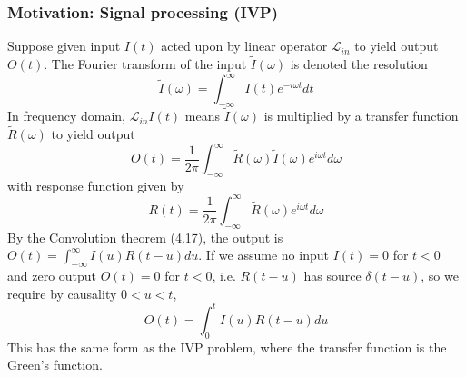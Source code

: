 \documentclass[a4paper]{article}
\begin{document}
\subsubsection*{Motivation: Signal processing (IVP)}
Suppose given input $I(t)$ acted upon by linear operator $\mathcal{L}_{in}$ to yield output $O(t)$. The Fourier transform of the input $\tilde{I}(\omega)$ is denoted the resolution
\begin{equation}
    \tilde{I}(\omega)=\int_{-\infty}^\infty I(t)e^{-i\omega t}dt\tag{4.24}
\end{equation}
In frequency domain, $\mathcal{L}_{in}I(t)$ means $\tilde{I}(\omega)$ is multiplied by a transfer function $\tilde{R}(\omega)$ to yield output
\begin{equation}
    O(t)=\frac{1}{2\pi}\int_{-\infty}^\infty\tilde{R}(\omega)\tilde{I}(\omega)e^{i\omega t}d\omega\tag{4.25}
\end{equation}
with response function given by
\begin{equation}
    R(t)=\frac{1}{2\pi}\int_{-\infty}^\infty\tilde{R}(\omega)e^{i\omega t}d\omega\tag{4.26}
\end{equation}
By the Convolution theorem (4.17), the output is $O(t)=\int_{-\infty}^\infty I(u)R(t-u)du$. If we assume no input $I(t)=0$ for $t<0$ and zero output $O(t)=0$ for $t<0$, i.e. $R(t-u)$ has source $\delta(t-u)$, so we require by causality $0<u<t$,
\begin{equation}
    O(t)=\int_0^tI(u)R(t-u)du\tag{4.27}
\end{equation}
This has the same form as the IVP problem, where the transfer function is the Green's function.
\newpage
\end{document}
